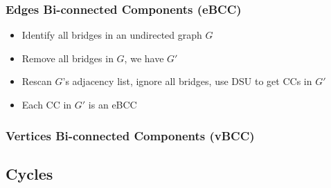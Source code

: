 \documentclass[10pt]{article}{\twocolumn}
\begin{document}
\subsubsection{Edges Bi-connected Components (eBCC)}
\begin{itemize}
    \item Identify all bridges in an undirected graph $G$
    \item Remove all bridges in $G$, we have $G'$
    \item Rescan $G$'s adjacency list, ignore all bridges, use DSU to get CCs in $G'$
    \item Each CC in $G'$ is an eBCC
\end{itemize}
\subsubsection{Vertices Bi-connected Components (vBCC)}

\subsection{Cycles}
\end{document}
